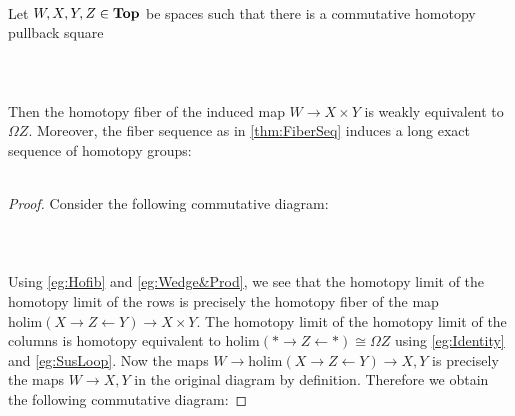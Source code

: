 \documentclass[a4paper]{article}
\begin{document}
\begin{prp}{}{}\\
Let $W,X,Y,Z\in\bold{Top}$ be spaces such that there is a commutative homotopy pullback square  
 \\~\\  \\~\\
Then the homotopy fiber of the induced map $W\to X\times Y$ is weakly equivalent to $\Omega Z$. Moreover, the fiber sequence as in \ref{thm:FiberSeq} induces a long exact sequence of homotopy groups:
\\~\\  
\begin{proof}
Consider the following commutative diagram:
\\~\\  \\~\\
Using \ref{eg:Hofib} and \ref{eg:Wedge&Prod}, we see that the homotopy limit of the homotopy limit of the rows is precisely the homotopy fiber of the map $\text{holim}(X\rightarrow Z\leftarrow Y)\to X\times Y$. The homotopy limit of the homotopy limit of the columns is homotopy equivalent to $\text{holim}(\ast\rightarrow Z\leftarrow\ast)\cong\Omega Z$ using \ref{eg:Identity} and \ref{eg:SusLoop}. Now the maps $W\to\text{holim}(X\rightarrow Z\leftarrow Y)\to X,Y$ is precisely the maps $W\to X,Y$ in the original diagram by definition. Therefore we obtain the following commutative diagram: 

\end{proof}
\end{prp}
\end{document}
